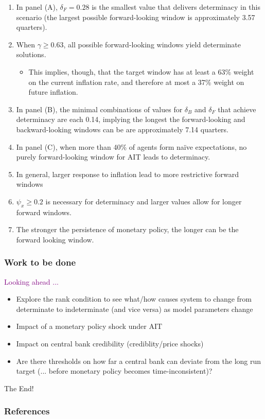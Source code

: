 \documentclass{beamer}
\begin{document}
\begin{frame}[allowframebreaks]
	\begin{enumerate}
		\setlength{\itemsep}{1em}
		\item In panel (A), $\delta_F =0.28$ is the smallest value that delivers determinacy in this scenario (the largest possible forward-looking window is approximately 3.57 quarters).
		\item When $\gamma \geq 0.63$, all possible forward-looking windows yield determinate solutions. 
		\begin{itemize}
			\item This implies, though, that the target window has at least a 63\% weight on the current inflation rate, and therefore at most a 37\% weight on future inflation.
		\end{itemize}
		\item In panel (B), the minimal combinations of values for $\delta_B$ and $\delta_F$ that achieve determinacy are each 0.14, implying the longest the forward-looking and backward-looking windows can be are approximately 7.14 quarters.
		\item In panel (C), when more than 40\% of agents form na\"ive expectations, no purely forward-looking window for AIT leads to determinacy.
		\item In general, larger response to inflation lead to more restrictive forward windows
		\item $\psi_x \geq 0.2$ is necessary for determinacy and larger values allow for longer forward windows.  
		\item The stronger the persistence of monetary policy, the longer can be the forward looking window.
	\end{enumerate}
\end{frame}

\begin{frame}
	\frametitle{Work to be done}
	\textcolor{purple}{Looking ahead ...}
	\begin{itemize}
		\setlength{\itemsep}{1em}
		\item Explore the rank condition to see what/how causes system to change from determinate to indeterminate (and vice versa) as model parameters change
		\item Impact of a monetary policy shock under AIT
		\item Impact on central bank credibility (crediblity/price shocks)
		\item Are there thresholds on how far a central bank can deviate from the long run target (... before monetary policy becomes time-inconsistent)?
	\end{itemize}
\end{frame}

\begin{frame}
	\centering
	The End!
\end{frame}

\appendix
\begin{frame}[allowframebreaks]
	\frametitle{References}
	
	
\end{frame}
\end{document}
